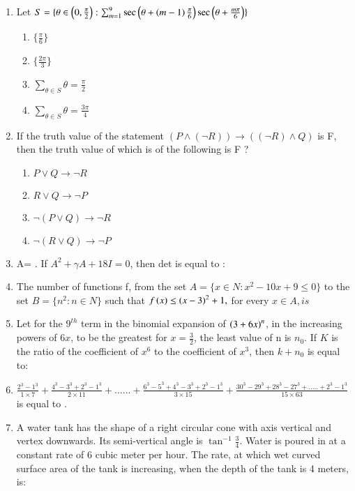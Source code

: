 \documentclass[journal]{IEEEtran}
\begin{document}
\begin{enumerate}
    \item Let $S=\{\theta \in \left(0,\frac{\pi}{2}\right) :\sum_{m=1}^{9}\sec \left(\theta+\left(m-1\right)\frac{\pi}{6}\right)\sec \left(\theta+\frac{m\pi}{6}\right)\}$
		\begin{multicols}{1}
			\begin{enumerate}
				\item $\{\frac{\pi}{6}\}$
				\item $\{\frac{2\pi}{3}\}$
				\item $\sum_{\theta \in S}\theta =\frac{\pi}{2}$
				\item $\sum_{\theta \in S}\theta =\frac{3\pi}{4}$
			\end{enumerate}
		\end{multicols}

    \item If the truth value of the statement $(P\land(\neg R))\rightarrow ((\neg R) \land Q)$ is F, then the truth value of which is of the following is F ?

		\begin{multicols}{1}
			\begin{enumerate}
				\item $P \lor Q \rightarrow \neg R$
				\item $R \lor Q \rightarrow \neg P$
				\item $\neg (P \lor Q) \rightarrow \neg R$
				\item $\neg (R \lor Q) \rightarrow \neg P$
			\end{enumerate}
		\end{multicols}

    \item A=  . If $A^2+\gamma A+ 18I=0$, then det is equal to :\\
    \item The number of functions f, from the set $A= \{x \in N: x^2-10x+9 \leq 0 \}$ to the set
    $B= \{ n^2 : n\in N\}$ such that $f\left(x\right)\leq
     \left(x-3\right)^2+1,$ for every $x \in A, is $\\
    \item Let for the $9^{th}$ term in the binomial expansion of $\left(3+6x\right)^n$, in the increasing powers of $6x$, to be the greatest for $x=\frac{3}{2}$, the least value of n is $n_0$.  If $K$ 
    is the ratio of the coefficient of $x^6$ to the coefficient of $x^3$, then $k+n_0$ is equal to:
\\
    \item $\frac{2^3-1^3}{1\times7} + \frac{4^3-3^3+2^3-1^3}{2\times 11} +......+\frac{6^3-5^3+4^3-3^3+2^3-1^3}{3\times 15} +\frac{30^3-29^3+28^3-27^3+.....+2^3-1^3}{15\times 63}$ is equal to .\\
    \item A water tank has the shape of a right circular cone with axis vertical and vertex downwards. Its semi-vertical angle is $\tan^{-1}\frac{3}{4}$. Water is poured in at a constant rate of 6 cubic  meter per hour. The rate, at which wet curved surface area of the tank is increasing, when the depth of the tank is 4 meters, is:\\


\end{enumerate}
\end{document}
